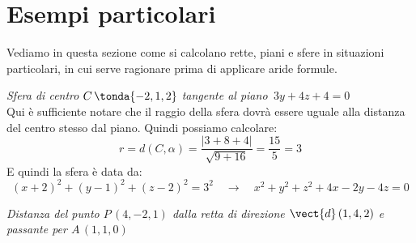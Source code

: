 \section{Esempi particolari}

Vediamo in questa sezione come si calcolano rette, piani e sfere in situazioni particolari, in cui serve ragionare prima di applicare aride formule.

\begin{esempio}
 \emph{Sfera di centro $C\,\tonda{-2,1,2}$ tangente al piano \,$3y+4z+4=0$}\\[7pt]
 Qui è sufficiente notare che il raggio della sfera dovrà essere uguale alla distanza del centro stesso dal piano. Quindi possiamo calcolare:
 \[r = d(C,\alpha) = \frac{|3+8+4|}{\sqrt{9+16}} = \frac{15}{5} = 3\]
 E quindi la sfera è data da:
 \[(x+2)^2+(y-1)^2+(z-2)^2=3^2 \quad \longrightarrow \quad x^2+y^2+z^2+4x-2y-4z=0\]
\end{esempio}
\begin{esempio}
 \emph{Distanza del punto $P\,(4,-2,1)$ dalla retta di direzione $\vect{d} \, (1,4,2)$ e passante per $A\,(1,1,0)$}\\[7pt]
\end{esempio}

